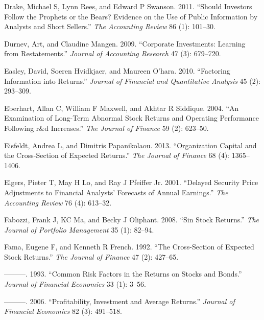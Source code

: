 \documentclass[
  letterpaper,
  DIV=11,
  numbers=noendperiod]{scrreprt}
\newlength{\cslhangindent}
\newlength{\cslentryspacingunit} %
\newenvironment{CSLReferences}[2] %
 {%
  \setlength{\parindent}{0pt}
  \ifodd #1
  \let\oldpar\par
  \def\par{\hangindent=\cslhangindent\oldpar}
  \fi
  \setlength{\parskip}{#2\cslentryspacingunit}
 }%
 {}
\begin{document}
\begin{CSLReferences}{1}{0}
\leavevmode{}%
Drake, Michael S, Lynn Rees, and Edward P Swanson. 2011. {``Should
Investors Follow the Prophets or the Bears? Evidence on the Use of
Public Information by Analysts and Short Sellers.''} \emph{The
Accounting Review} 86 (1): 101--30.

\leavevmode{}%
Durnev, Art, and Claudine Mangen. 2009. {``Corporate Investments:
Learning from Restatements.''} \emph{Journal of Accounting Research} 47
(3): 679--720.

\leavevmode{}%
Easley, David, Soeren Hvidkjaer, and Maureen O'hara. 2010. {``Factoring
Information into Returns.''} \emph{Journal of Financial and Quantitative
Analysis} 45 (2): 293--309.

\leavevmode{}%
Eberhart, Allan C, William F Maxwell, and Akhtar R Siddique. 2004. {``An
Examination of Long-Term Abnormal Stock Returns and Operating
Performance Following r\&d Increases.''} \emph{The Journal of Finance}
59 (2): 623--50.

\leavevmode{}%
Eisfeldt, Andrea L, and Dimitris Papanikolaou. 2013. {``Organization
Capital and the Cross-Section of Expected Returns.''} \emph{The Journal
of Finance} 68 (4): 1365--1406.

\leavevmode{}%
Elgers, Pieter T, May H Lo, and Ray J Pfeiffer Jr. 2001. {``Delayed
Security Price Adjustments to Financial Analysts' Forecasts of Annual
Earnings.''} \emph{The Accounting Review} 76 (4): 613--32.

\leavevmode{}%
Fabozzi, Frank J, KC Ma, and Becky J Oliphant. 2008. {``Sin Stock
Returns.''} \emph{The Journal of Portfolio Management} 35 (1): 82--94.

\leavevmode{}%
Fama, Eugene F, and Kenneth R French. 1992. {``The Cross-Section of
Expected Stock Returns.''} \emph{The Journal of Finance} 47 (2):
427--65.

\leavevmode{}%
---------. 1993. {``Common Risk Factors in the Returns on Stocks and
Bonds.''} \emph{Journal of Financial Economics} 33 (1): 3--56.

\leavevmode{}%
---------. 2006. {``Profitability, Investment and Average Returns.''}
\emph{Journal of Financial Economics} 82 (3): 491--518.


\end{CSLReferences}
\end{document}
